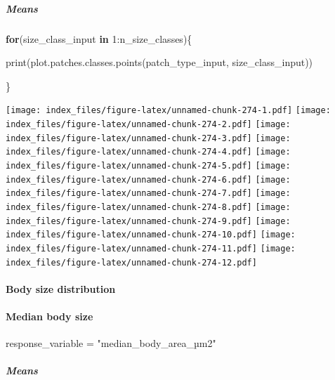 \documentclass[
]{article}
\newenvironment{Shaded}{\begin{snugshade}}{\end{snugshade}}
\newcommand{\ControlFlowTok}[1]{\textcolor[rgb]{0.13,0.29,0.53}{\textbf{#1}}}
\newcommand{\DecValTok}[1]{\textcolor[rgb]{0.00,0.00,0.81}{#1}}
\newcommand{\FunctionTok}[1]{\textcolor[rgb]{0.00,0.00,0.00}{#1}}
\newcommand{\NormalTok}[1]{#1}
\newcommand{\OtherTok}[1]{\textcolor[rgb]{0.56,0.35,0.01}{#1}}
\newcommand{\SpecialCharTok}[1]{\textcolor[rgb]{0.00,0.00,0.00}{#1}}
\newcommand{\StringTok}[1]{\textcolor[rgb]{0.31,0.60,0.02}{#1}}
\begin{document}
\hypertarget{means-13}{%
\subparagraph{Means}\label{means-13}}

\begin{Shaded}
\begin{Highlighting}[]
\ControlFlowTok{for}\NormalTok{(size\_class\_input }\ControlFlowTok{in} \DecValTok{1}\SpecialCharTok{:}\NormalTok{n\_size\_classes)\{}
  
  \FunctionTok{print}\NormalTok{(}\FunctionTok{plot.patches.classes.points}\NormalTok{(patch\_type\_input,}
\NormalTok{                                    size\_class\_input))}
  
\NormalTok{\}}
\end{Highlighting}
\end{Shaded}

\texttt{[image: index\_files/figure-latex/unnamed-chunk-274-1.pdf]}
\texttt{[image: index\_files/figure-latex/unnamed-chunk-274-2.pdf]}
\texttt{[image: index\_files/figure-latex/unnamed-chunk-274-3.pdf]}
\texttt{[image: index\_files/figure-latex/unnamed-chunk-274-4.pdf]}
\texttt{[image: index\_files/figure-latex/unnamed-chunk-274-5.pdf]}
\texttt{[image: index\_files/figure-latex/unnamed-chunk-274-6.pdf]}
\texttt{[image: index\_files/figure-latex/unnamed-chunk-274-7.pdf]}
\texttt{[image: index\_files/figure-latex/unnamed-chunk-274-8.pdf]}
\texttt{[image: index\_files/figure-latex/unnamed-chunk-274-9.pdf]}
\texttt{[image: index\_files/figure-latex/unnamed-chunk-274-10.pdf]}
\texttt{[image: index\_files/figure-latex/unnamed-chunk-274-11.pdf]}
\texttt{[image: index\_files/figure-latex/unnamed-chunk-274-12.pdf]}

\hypertarget{body-size-distribution}{%
\paragraph{Body size distribution}\label{body-size-distribution}}

\hypertarget{median-body-size}{%
\paragraph{Median body size}\label{median-body-size}}

\begin{Shaded}
\begin{Highlighting}[]
\NormalTok{response\_variable }\OtherTok{=} \StringTok{"median\_body\_area\_µm2"}
\end{Highlighting}
\end{Shaded}

\hypertarget{means-14}{%
\subparagraph{Means}\label{means-14}}
\end{document}

